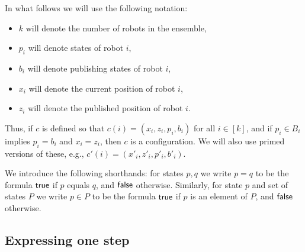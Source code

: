 In what follows we will use the following notation:
\begin{itemize}
 \item $k$ will denote the number of robots in the ensemble,
 \item $p_i$ will denote states of robot $i$,
 \item $b_i$ will denote publishing states of robot $i$,
 \item $x_i$ will denote the current position of robot $i$,
 \item $z_i$ will denote the published position of robot $i$.
\end{itemize}
Thus, if $c$ is defined so that $c(i) = (x_i,z_i,p_i,b_i)$ for all $i \in [k]$, and if $p_i \in B_i$ implies $p_i = b_i$ and $x_i = z_i$, 
then $c$ is a configuration. We will also use primed versions of these, e.g., $c'(i) = (x'_i,z'_i,p'_i,b'_i)$.



We introduce the following shorthands: for states $p,q$ we write $p=q$ to be the \msol formula $\mathsf{true}$ if $p$ equals $q$, and $\mathsf{false}$ otherwise. 
Similarly, for state $p$ and set of states $P$ we write $p \in P$ to be the \msol formula $\mathsf{true}$ if $p$ is an element of $P$, and $\mathsf{false}$ otherwise.

% 


\subsection{Expressing one step}


